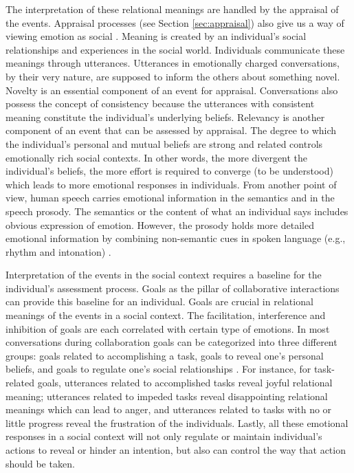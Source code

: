 \documentclass[12pt]{report}
\begin{document}
The interpretation of these relational meanings are handled by the appraisal of
the events. Appraisal processes (see Section \ref{sec:appraisal}) also
give us a way of viewing emotion as social \cite{hooft:sharing-emotions}. Meaning is
created by an individual's social relationships and experiences in the social
world. Individuals communicate these meanings through utterances. Utterances in
emotionally charged conversations, by their very nature, are supposed to inform
the others about something novel. Novelty is an essential component of an event
for appraisal. Conversations also possess the concept of consistency because the
utterances with consistent meaning constitute the individual's underlying
beliefs. Relevancy is another component of an event that can be assessed by
appraisal. The degree to which the individual's personal and mutual beliefs are
strong and related controls emotionally rich social contexts. In other words,
the more divergent the individual's beliefs, the more effort is required to
converge (to be understood) which leads to more emotional responses in
individuals. From another point of view, human speech carries emotional
information in the semantics and in the speech prosody. The semantics or the
content of what an individual says includes obvious expression of emotion.
However, the prosody holds more detailed emotional information by combining
non-semantic cues in spoken language (e.g., rhythm and intonation)
\cite{luneski:emotion-aware-interaction}.

Interpretation of the events in the social context requires a baseline for the
individual's assessment process. Goals as the pillar of collaborative
interactions can provide this baseline for an individual. Goals are crucial in
relational meanings of the events in a social context. The facilitation,
interference and inhibition of goals are each correlated with certain type of
emotions. In most conversations during collaboration goals can be categorized
into three different groups: goals related to accomplishing a task, goals to
reveal one's personal beliefs, and goals to regulate one's social relationships
\cite{planalp:communicating-emotion}. For instance, for task-related goals,
utterances related to accomplished tasks reveal joyful relational meaning;
utterances related to impeded tasks reveal disappointing relational meanings
which can lead to anger, and utterances related to tasks with no or little
progress reveal the frustration of the individuals. Lastly, all these emotional
responses in a social context will not only regulate or maintain individual's
actions to reveal or hinder an intention, but also can control the way that
action should be taken.
\end{document}
